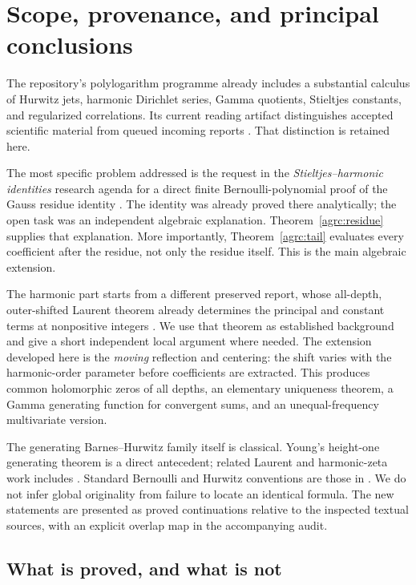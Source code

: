 \section{Scope, provenance, and principal conclusions}
\label{agrc:scope}

The repository's polylogarithm programme already includes a substantial
calculus of Hurwitz jets, harmonic Dirichlet series, Gamma quotients,
Stieltjes constants, and regularized correlations. Its current reading
artifact distinguishes accepted scientific material from queued incoming
reports \cite{repo-manuscript}. That distinction is retained here.

The most specific problem addressed is the request in the
\emph{Stieltjes--harmonic identities} research agenda for a direct finite
Bernoulli-polynomial proof of the Gauss residue identity
\cite{repo-agenda,repo-gauss}. The identity was already proved there
analytically; the open task was an independent algebraic explanation.
Theorem~\ref{agrc:residue} supplies that explanation. More importantly,
Theorem~\ref{agrc:tail} evaluates every coefficient after the residue,
not only the residue itself. This is the main algebraic extension.

The harmonic part starts from a different preserved report, whose
all-depth, outer-shifted Laurent theorem already determines the principal
and constant terms at nonpositive integers \cite{repo-laurent}. We use
that theorem as established background and give a short independent
local argument where needed. The extension developed here is the
\emph{moving} reflection and centering: the shift varies with the
harmonic-order parameter before coefficients are extracted. This
produces common holomorphic zeros of all depths, an elementary
uniqueness theorem, a Gamma generating function for convergent sums,
and an unequal-frequency multivariate version.

The generating Barnes--Hurwitz family itself is classical. Young's
height-one generating theorem \cite{Young2024} is a direct antecedent;
related Laurent and harmonic-zeta work includes
\cite{Young2023,Can2024}. Standard Bernoulli and Hurwitz conventions are
those in \cite{DLMF24,DLMF25}. We do not infer global originality from
failure to locate an identical formula. The new statements are presented
as proved continuations relative to the inspected textual sources, with
an explicit overlap map in the accompanying audit.

\subsection{What is proved, and what is not}

